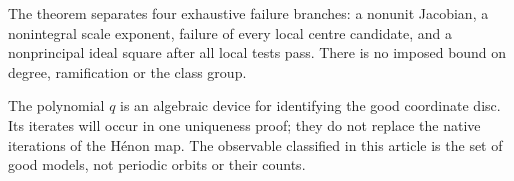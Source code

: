 The theorem separates four exhaustive failure branches: a nonunit
Jacobian, a nonintegral scale exponent, failure of every local centre
candidate, and a nonprincipal ideal square after all local tests pass.
There is no imposed bound on degree, ramification or the class group.

\begin{remark}
The polynomial $q$ is an algebraic device for identifying the good
coordinate disc. Its iterates will occur in one uniqueness proof; they
do not replace the native iterations of the H\'enon map. The observable
classified in this article is the set of good models, not periodic
orbits or their counts.
\end{remark}
